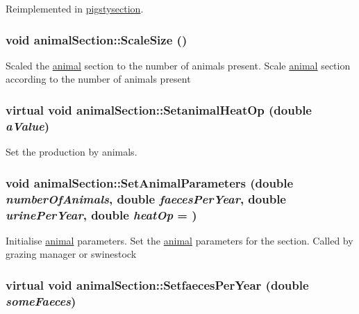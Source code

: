 Reimplemented in \hyperlink{classpigstysection_acce45c15afb18b52d83a351643d03b57}{pigstysection}.\hypertarget{classanimal_section_a30e3588926513981f209862ca76980cc}{
\subsubsection[{ScaleSize}]{\setlength{\rightskip}{0pt plus 5cm}void animalSection::ScaleSize ()}}
\label{classanimal_section_a30e3588926513981f209862ca76980cc}


Scaled the \hyperlink{classanimal}{animal} section to the number of animals present. Scale \hyperlink{classanimal}{animal} section according to the number of animals present \hypertarget{classanimal_section_a89807aacadf08b582db9e9d6bc40fa16}{
\subsubsection[{SetanimalHeatOp}]{\setlength{\rightskip}{0pt plus 5cm}virtual void animalSection::SetanimalHeatOp (double {\em aValue})}}
\label{classanimal_section_a89807aacadf08b582db9e9d6bc40fa16}


Set the production by animals. \hypertarget{classanimal_section_a8266d11321ed09220ff65d4b2f765714}{
\subsubsection[{SetAnimalParameters}]{\setlength{\rightskip}{0pt plus 5cm}void animalSection::SetAnimalParameters (double {\em numberOfAnimals}, \/  double {\em faecesPerYear}, \/  double {\em urinePerYear}, \/  double {\em heatOp} = {})}}
\label{classanimal_section_a8266d11321ed09220ff65d4b2f765714}


Initialise \hyperlink{classanimal}{animal} parameters. Set the \hyperlink{classanimal}{animal} parameters for the section. Called by grazing manager or swinestock \hypertarget{classanimal_section_a97192665631325ed05570268d9a332d3}{
\subsubsection[{SetfaecesPerYear}]{\setlength{\rightskip}{0pt plus 5cm}virtual void animalSection::SetfaecesPerYear (double {\em someFaeces})}}
\label{classanimal_section_a97192665631325ed05570268d9a332d3}


